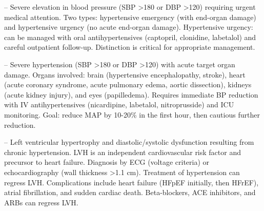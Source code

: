 -- Severe elevation in blood pressure (SBP >180 or DBP >120) requiring urgent medical attention. Two types: hypertensive emergency (with end-organ damage) and hypertensive urgency (no acute end-organ damage). Hypertensive urgency: can be managed with oral antihypertensives (captopril, clonidine, labetalol) and careful outpatient follow-up. Distinction is critical for appropriate management.

-- Severe hypertension (SBP >180 or DBP >120) with acute target organ damage. Organs involved: brain (hypertensive encephalopathy, stroke), heart (acute coronary syndrome, acute pulmonary edema, aortic dissection), kidneys (acute kidney injury), and eyes (papilledema). Requires immediate BP reduction with IV antihypertensives (nicardipine, labetalol, nitroprusside) and ICU monitoring. Goal: reduce MAP by 10-20\% in the first hour, then cautious further reduction.

-- Left ventricular hypertrophy and diastolic/systolic dysfunction resulting from chronic hypertension. LVH is an independent cardiovascular risk factor and precursor to heart failure. Diagnosis by ECG (voltage criteria) or echocardiography (wall thickness >1.1 cm). Treatment of hypertension can regress LVH. Complications include heart failure (HFpEF initially, then HFrEF), atrial fibrillation, and sudden cardiac death. Beta-blockers, ACE inhibitors, and ARBs can regress LVH.

